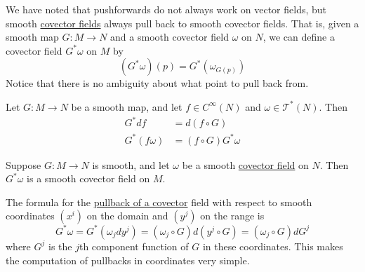 \documentclass{article}
\newcounter{theorem}[section]
\begin{document}
    We have noted that pushforwards do not always work on vector fields, but smooth \hyperref[def:covector-field]{covector fields} always pull back to smooth covector fields. That is, given a smooth map $G: M \to N$ and a smooth covector field $\omega$ on $N$, we can define a covector field $G^* \omega$ on $M$ by 
    \begin{equation}
      (G^* \omega) (p) = G^* (\omega_{G(p)})
    \end{equation}
    Notice that there is no ambiguity about what point to pull back from. 

    \begin{lemma}
      \label{thm:pullback-commutes-with-the-differential}
    Let $G: M \to N$ be a smooth map, and let $f \in C^\infty(N)$ and $\omega \in \mathcal{T}^* (N)$. Then 
    \begin{align*}
        G^* df & = d (f \circ G) \\
        G^* (f \omega) & = (f \circ G) G^* \omega 
    \end{align*}
    \end{lemma}

    \begin{theorem}
      \label{thm:pullbacks-preserve-smoothness}
    Suppose $G: M \to N$ is smooth, and let $\omega$ be a smooth \hyperref[def:covector-field]{covector field} on $N$. Then $G^* \omega$ is a smooth covector field on $M$. 
    \end{theorem}

    The formula for the \hyperref[def:pullback-of-a-covector]{pullback of a covector} field with respect to smooth coordinates $(x^i)$ on the domain and $(y^j)$ on the range is
    \begin{equation}
      G^* \omega = G^* (\omega_j dy^j) = (\omega_j \circ G) d(y^j \circ G) = (\omega_j \circ G) dG^j
    \end{equation}
    where $G^j$ is the $j$th component function of $G$ in these coordinates. This makes the computation of pullbacks in coordinates very simple. 
\end{document}
